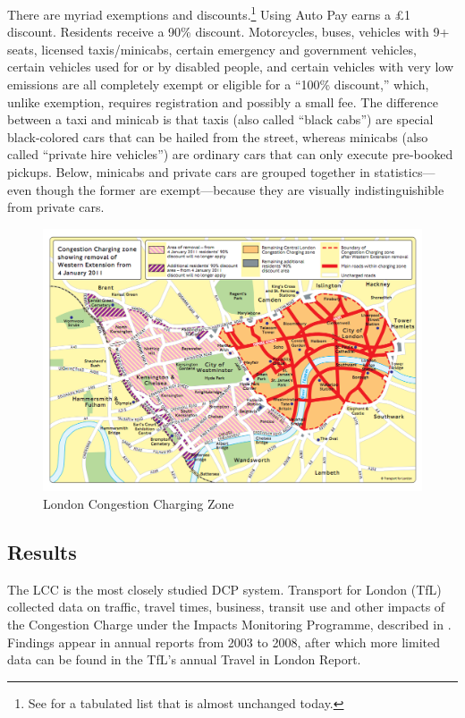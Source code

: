 There are myriad exemptions and discounts.\footnote{See \citet[Table 1, p. 515]{Santos2005} for a tabulated list that is almost unchanged today.} Using Auto Pay earns a \pounds1 discount. Residents receive a 90\% discount. Motorcycles, buses, vehicles with 9+ seats, licensed taxis/minicabs, certain emergency and government vehicles, certain vehicles used for or by  disabled people, and certain vehicles with very low emissions are all completely exempt or eligible for a ``100\% discount,'' which, unlike exemption, requires registration and possibly a small fee. The difference between a taxi and minicab is that taxis (also called ``black cabs'') are special black-colored cars that can be hailed from the street, whereas minicabs (also called ``private hire vehicles'') are ordinary cars that can only execute pre-booked pickups. Below, minicabs and private cars are grouped together in statistics---even though the former are exempt---because they are visually indistinguishible from private cars.

\begin{figure}[ht]
    \includegraphics[width=1\textwidth]{../img/london-congestion-charge.png}
    
    \caption{London Congestion Charging Zone \label{fig:London-Congestion-Charging}}
\end{figure}


\subsection{Results}

The LCC is the most closely studied DCP system. Transport for London (TfL) collected data on traffic, travel times, business, transit use and other impacts of the Congestion Charge under the Impacts Monitoring Programme, described in \citet[Sec. 1]{TfLFirst2003}. Findings appear in annual reports from 2003 to 2008, after which more limited data can be found in the TfL's annual Travel in London Report.

